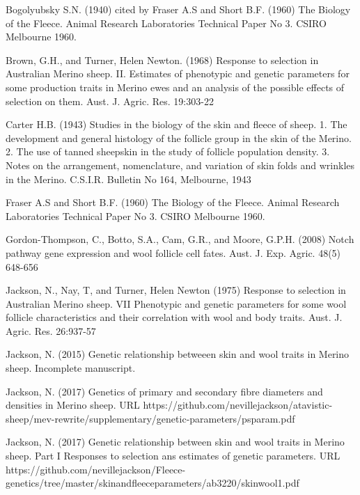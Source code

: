 \documentclass[titlepage]{article}  %
\begin{document}
\clearpage
\begin{thebibliography}{99}

 Bogolyubsky S.N. (1940) cited by Fraser A.S and Short B.F. (1960) The Biology of the Fleece. Animal Research Laboratories Technical Paper No 3. CSIRO Melbourne 1960.

Brown, G.H., and Turner, Helen Newton. (1968) Response to selection in Australian Merino sheep. II. Estimates of phenotypic and genetic parameters for some production traits in Merino ewes and an analysis of the possible effects of selection on them. Aust. J. Agric. Res. 19:303-22

Carter H.B. (1943) Studies in the biology of the skin and fleece of sheep. 1. The development and general histology of the follicle group in the skin of the Merino. 2. The use of tanned sheepskin in the study of follicle population density. 3. Notes on the arrangement, nomenclature, and variation of skin folds and wrinkles in the Merino. C.S.I.R. Bulletin No 164, Melbourne, 1943

Fraser A.S and Short B.F. (1960) The Biology of the Fleece. Animal Research Laboratories Technical Paper No 3. CSIRO Melbourne 1960.

Gordon-Thompson, C., Botto, S.A., Cam, G.R., and Moore, G.P.H. (2008) Notch pathway gene expression and wool follicle cell fates. Aust. J. Exp. Agric. 48(5) 648-656

Jackson, N., Nay, T, and Turner, Helen Newton (1975) Response to selection in Australian Merino sheep. VII Phenotypic and genetic parameters for some wool follicle characteristics and their correlation with wool and body traits. Aust. J. Agric. Res. 26:937-57

Jackson, N. (2015) Genetic relationship betweeen skin and wool traits in Merino sheep. Incomplete manuscript.

Jackson, N. (2017) Genetics of primary and secondary fibre diameters and densities in Merino sheep. URL https://github.com/nevillejackson/atavistic-sheep/mev-rewrite/supplementary/genetic-parameters/psparam.pdf

Jackson, N. (2017) Genetic relationship between skin and wool traits in Merino sheep. Part I Responses to selection ans estimates of genetic parameters. URL https://github.com/nevillejackson/Fleece-genetics/tree/master/skinandfleeceparameters/ab3220/skinwool1.pdf


\end{thebibliography}
\end{document}
